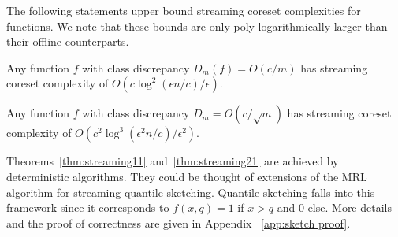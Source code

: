 \documentclass[12pt]{colt2019} %
\newcommand{\eps}{\epsilon}
\begin{document}
\noindent The following statements upper bound streaming coreset complexities for functions. We note that these bounds are only poly-logarithmically larger than their offline counterparts. 

\begin{theorem} \label{thm:streaming11}
Any function $f$ with class discrepancy $D_m(f) = O(c/m)$ has streaming coreset complexity of $O\left(c\log^2(\eps n/c)/\eps\right)$.
\end{theorem}

\begin{theorem} \label{thm:streaming21}
Any function $f$ with class discrepancy $D_m = O(c/\sqrt{m})$ has streaming coreset complexity of $O\left(c^2\log^3(\eps^2 n/c) /\eps^2\right)$.
\end{theorem}

Theorems~\ref{thm:streaming11} and~\ref{thm:streaming21} are achieved by deterministic algorithms. 
They could be thought of extensions of the MRL algorithm \cite{MRL} for streaming quantile sketching. 
Quantile sketching falls into this framework since it corresponds to $f(x,q) = 1$ if $x>q$ and $0$ else. 
More details and the proof of correctness are given in Appendix ~\ref{app:sketch proof}.
\end{document}
